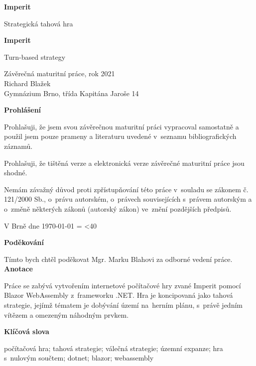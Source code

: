 \documentclass[a4paper,12pt]{article}
\author{Richard Blažek}
\makeatletter
\newcommand{\repeatchar}[2]{%
  \begingroup
  \my@repeat@count=\z@
  \@whilenum\my@repeat@count<#1\do{#2\advance\my@repeat@count\@ne}%
  \endgroup
}
\makeatother
\begin{document}
\begin{titlepage}
    \begin{center}

	\vspace*{3cm}            
	\Huge
	\textbf{Imperit}
            
	\vspace{0.5cm}
	\LARGE
	Strategická tahová hra
        
	\vspace*{1cm}
	\Huge
	\textbf{Imperit}
            
	\vspace{0.5cm}
	\LARGE
	Turn-based strategy
            
	\vfill
            
	\large
        Závěrečná maturitní práce, rok 2021\\
	Richard Blažek\\
	Gymnázium Brno, třída Kapitána Jaroše 14
    \end{center}
\end{titlepage}
\thispagestyle{empty}
\Large\textbf{Prohlášení}\normalsize

Prohlašuji, že jsem svou závěrečnou maturitní práci vypracoval samostatně a použil jsem pouze prameny a literaturu uvedené v~seznamu bibliografických záznamů.

Prohlašuji, že tištěná verze a elektronická verze závěrečné maturitní práce jsou shodné.

Nemám závažný důvod proti zpřístupňování této práce v~souladu se zákonem č. 121/2000 Sb., o~právu autorském, o~právech souvisejících s~právem autorským a o~změně některých zákonů (autorský zákon) ve~znění pozdějších předpisů. 

V Brně dne \today{} \repeatchar{40}{.}
\newpage
\thispagestyle{empty}
\Large\textbf{Poděkování}\normalsize

Tímto bych chtěl poděkovat Mgr. Marku Blahovi za odborné vedení práce.
\newpage
\thispagestyle{empty}
\Large\textbf{Anotace}\normalsize

Práce se zabývá vytvořením internetové počítačové hry zvané Imperit pomocí Blazor WebAssembly z~frameworku .NET. Hra je koncipovaná jako tahová strategie, jejímž tématem je dobývání území na~herním plánu, s~právě jedním vítězem a omezeným náhodným prvkem.

\Large\textbf{Klíčová slova}\normalsize

počítačová hra; tahová strategie; válečná strategie; územní expanze; hra s~nulovým součtem;\- dotnet; blazor; webassembly
\end{document}
